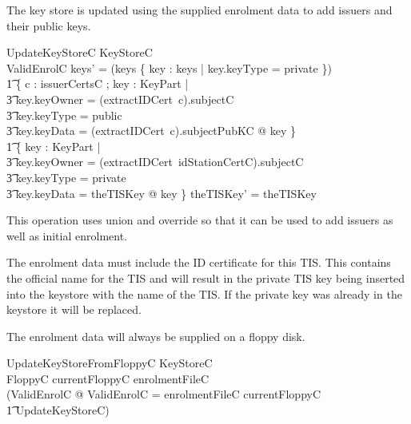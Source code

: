 The key store is updated using the supplied enrolment data 
to add issuers and their public keys.

\begin{schema}{UpdateKeyStoreC}
        \Delta KeyStoreC
\\      ValidEnrolC
\where
        keys' = (keys \setminus \{ key : keys | key.keyType = private \})
\\ \t1                 \cup \{ c : \ran issuerCertsC ;  key : KeyPart |
\\ \t3        key.keyOwner = (extractIDCert~c).subjectC    
\\ \t3        \land key.keyType = public
\\ \t3        \land key.keyData = (extractIDCert~c).subjectPubKC @ key \} 
\\ \t1 \cup 
        \{ key : KeyPart | 
\\ \t3        key.keyOwner = (extractIDCert~idStationCertC).subjectC    
\\ \t3        \land key.keyType = private
\\ \t3        \land key.keyData = theTISKey @ key \} 
\also
        theTISKey' = theTISKey

\end{schema}
\begin{Zcomment}
\item
This operation uses union and override so that it can be used to add
issuers as well as initial enrolment. 
\item
The enrolment data must include the ID certificate for this TIS. This
contains the official name for the TIS and will result in the private
TIS key being inserted into the keystore with the name of the TIS. If
the private key was already in the keystore it will be replaced.
\end{Zcomment}

The enrolment data will always be supplied on a floppy disk.

\begin{schema}{UpdateKeyStoreFromFloppyC}
        \Delta KeyStoreC
\\      FloppyC
\where
        currentFloppyC \in \ran enrolmentFileC
\\
        (\exists ValidEnrolC @ \theta ValidEnrolC = enrolmentFileC \inv
currentFloppyC
\\ \t1  \land UpdateKeyStoreC)   
\also
\end{schema}

